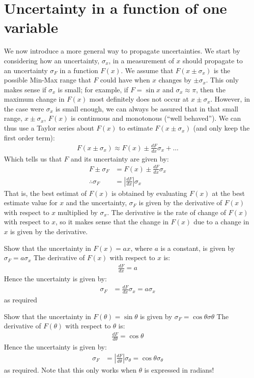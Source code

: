 \section{Uncertainty in a function of one variable}
We now introduce a more general way to propagate uncertainties. We start by considering how an uncertainty, $\sigma_{x}$, in a measurement of $x$ should propagate to an uncertainty $\sigma_{F}$ in a function $F(x)$. We assume that $F(x \pm \sigma_{x})$ is the possible Min-Max range that $F$ could have when $x$ changes by $\pm\sigma_{x}$. This only makes sense if $\sigma_{x}$ is small; for example, if $F=\sin x$ and $\sigma_{x} \approx \pi$, then the maximum change in $F(x)$ most definitely does not occur at $x\pm\sigma_{x}$. However, in the case were $\sigma_{x}$ is small enough, we can always be assured that in that small range, $x\pm\sigma_{x}$,  $F(x)$ is continuous and monotonous (``well behaved''). We can thus use a Taylor series about $F(x)$ to estimate $F(x\pm\sigma_{x})$ (and only keep the first order term):
\begin{align}
F(x\pm\sigma_{x})\approx F(x)\pm\frac{dF}{dx}\sigma_{x}+\dots
\end{align}
Which tells us that $F$ and its uncertainty are given by:
\begin{align}
F \pm \sigma_{F} &= F(x) \pm \frac{dF}{dx}\sigma_{x}\nonumber\\
\therefore \sigma_{F}&=\left|\frac{dF}{dx}\right| \sigma_{x}
\end{align}
That is, the best estimat of $F(x)$ is obtained by evaluating $F(x)$ at the best estimate value for $x$ and the uncertainty, $\sigma_{F}$ is given by the derivative of $F(x)$ with respect to $x$ multiplied by $\sigma_{x}$.  The derivative is the rate of change of $F(x)$ with respect to $x$, so it makes sense that the change in $F(x)$ due to a change in $x$ is given by the derivative.

\begin{example}{Show that the uncertainty in $F(x)=ax$, where $a$ is a constant, is given by $\sigma_{F}=a \sigma_{x}$}
The derivative of $F(x)$ with respect to $x$ is:
\begin{align*}
\frac{dF}{dx}=a
\end{align*}
Hence the uncertainty is given by:
\begin{align*}
\sigma_{F}&=\frac{dF}{dx} \sigma_{x}=a \sigma_{x}
\end{align*}
as required
\end{example}

\begin{example}{Show that the uncertainty in $F(\theta)=\sin\theta$ is given by $\sigma_{F}=\cos\theta\sigma\theta$}
The derivative of $F(\theta)$ with respect to $\theta$ is:
\begin{align*}
\frac{dF}{d\theta}=\cos\theta
\end{align*}
Hence the uncertainty is given by:
\begin{align*}
\sigma_{F}&=\left|\frac{dF}{d\theta}\right| \sigma_\theta=\cos\theta\sigma_\theta
\end{align*}
as required. Note that this only works when $\theta$ is expressed in radians!
\end{example}


